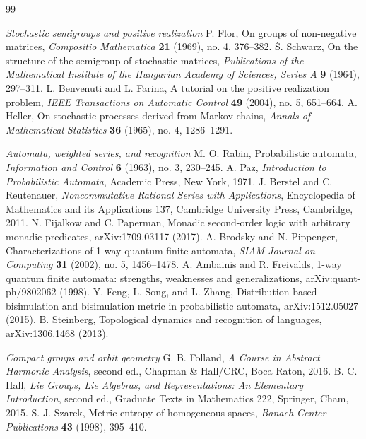 \begin{thebibliography}{99}
\item[]\textit{Stochastic semigroups and positive realization}
 P. Flor, On groups of non-negative matrices, \emph{Compositio Mathematica} \textbf{21} (1969), no. 4, 376--382.
 \v S. Schwarz, On the structure of the semigroup of stochastic matrices, \emph{Publications of the Mathematical Institute of the Hungarian Academy of Sciences, Series A} \textbf{9} (1964), 297--311.
 L. Benvenuti and L. Farina, A tutorial on the positive realization problem, \emph{IEEE Transactions on Automatic Control} \textbf{49} (2004), no. 5, 651--664.
 A. Heller, On stochastic processes derived from Markov chains, \emph{Annals of Mathematical Statistics} \textbf{36} (1965), no. 4, 1286--1291.
\item[]\textit{Automata, weighted series, and recognition}
 M. O. Rabin, Probabilistic automata, \emph{Information and Control} \textbf{6} (1963), no. 3, 230--245.
 A. Paz, \emph{Introduction to Probabilistic Automata}, Academic Press, New York, 1971.
 J. Berstel and C. Reutenauer, \emph{Noncommutative Rational Series with Applications}, Encyclopedia of Mathematics and its Applications 137, Cambridge University Press, Cambridge, 2011.
 N. Fijalkow and C. Paperman, Monadic second-order logic with arbitrary monadic predicates, arXiv:1709.03117 (2017).
 A. Brodsky and N. Pippenger, Characterizations of 1-way quantum finite automata, \emph{SIAM Journal on Computing} \textbf{31} (2002), no. 5, 1456--1478.
 A. Ambainis and R. Freivalds, 1-way quantum finite automata: strengths, weaknesses and generalizations, arXiv:quant-ph/9802062 (1998).
 Y. Feng, L. Song, and L. Zhang, Distribution-based bisimulation and bisimulation metric in probabilistic automata, arXiv:1512.05027 (2015).
 B. Steinberg, Topological dynamics and recognition of languages, arXiv:1306.1468 (2013).
\item[]\textit{Compact groups and orbit geometry}
 G. B. Folland, \emph{A Course in Abstract Harmonic Analysis}, second ed., Chapman \& Hall/CRC, Boca Raton, 2016.
 B. C. Hall, \emph{Lie Groups, Lie Algebras, and Representations: An Elementary Introduction}, second ed., Graduate Texts in Mathematics 222, Springer, Cham, 2015.
 S. J. Szarek, Metric entropy of homogeneous spaces, \emph{Banach Center Publications} \textbf{43} (1998), 395--410.

\end{thebibliography}
